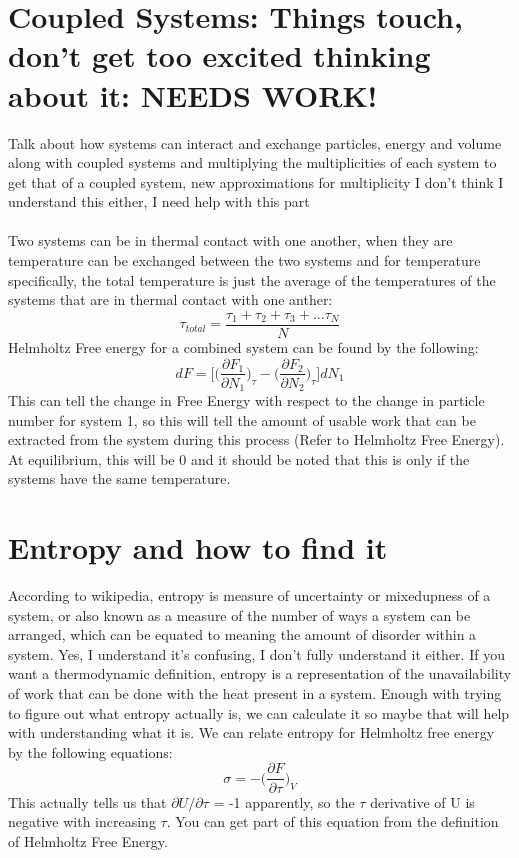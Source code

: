 \documentclass[arial]{article}
\begin{document}
\section*{Coupled Systems: Things touch, don't get too excited thinking about it:  NEEDS WORK!}
Talk about how systems can interact and exchange particles, energy and volume along with coupled systems and multiplying the multiplicities of each system to get that of a coupled system, new approximations for multiplicity
I don't think I understand this either, I need help with this part\\
\\
Two systems can be in thermal contact with one another, when they are temperature can be exchanged between the two systems and for temperature specifically, the total temperature is just the average of the temperatures of the systems that are in thermal contact with one anther:
\begin{equation}
\tau_{total}=\frac{\tau_1 + \tau_2 + \tau_3 + ... \tau_N}{N}
\end{equation}
Helmholtz Free energy for a combined system can be found by the following:
\begin{equation}
dF=\bigg[\bigg( \frac{\partial F_1}{\partial N_1}\bigg)_\tau -\bigg(\frac{\partial F_2}{\partial N_2}\bigg)_\tau \bigg] dN_1
\end{equation}
This can tell the change in Free Energy with respect to the change in particle number for system 1, so this will tell the amount of usable work that can be extracted from the system during this process (Refer to Helmholtz Free Energy). At equilibrium, this will be 0 and it should be noted that this is only if the systems have the same temperature.

\section*{Entropy and how to find it}
According to wikipedia, entropy is measure of uncertainty or mixedupness of a system, or also known as a measure of the number of ways a system can be arranged, which can be equated to meaning the amount of disorder within a system. Yes, I understand it's confusing, I don't fully understand it either. If you want a thermodynamic definition, entropy is a representation of the unavailability of work that can be done with the heat present in a system. Enough with trying to figure out what entropy actually is, we can calculate it so maybe that will help with understanding what it is. We can relate entropy for Helmholtz free energy by the following equations:
\begin{equation}
\sigma =-\bigg(\frac{\partial F}{\partial \tau}\bigg)_V
\end{equation}
This actually tells us that $\partial U / \partial \tau$ = -1 apparently, so the $\tau$ derivative of U is negative with increasing $\tau$. You can get part of this equation from the definition of Helmholtz Free Energy.
\vspace{3mm}
\end{document}
